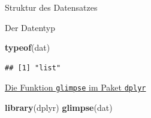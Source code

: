 \documentclass[ignorenonframetext,]{beamer}
\newenvironment{Shaded}{}{}
\newcommand{\KeywordTok}[1]{\textcolor[rgb]{0.00,0.44,0.13}{\textbf{{#1}}}}
\newcommand{\NormalTok}[1]{{#1}}
\begin{document}
\begin{frame}[fragile]{Struktur des Datensatzes}

\begin{block}{Der Datentyp}

\begin{Shaded}
\begin{Highlighting}[]
\KeywordTok{typeof}\NormalTok{(dat)}
\end{Highlighting}
\end{Shaded}

\begin{verbatim}
## [1] "list"
\end{verbatim}

\end{block}

\begin{block}{\href{https://stats.stackexchange.com/questions/11551/is-there-a-good-browser-viewer-to-see-an-r-dataset-rda-file}{Die
Funktion \texttt{glimpse} im Paket \texttt{dplyr}}}

\begin{Shaded}
\begin{Highlighting}[]
\KeywordTok{library}\NormalTok{(dplyr)}
\KeywordTok{glimpse}\NormalTok{(dat)}
\end{Highlighting}
\end{Shaded}


\end{block}
\end{frame}
\end{document}
